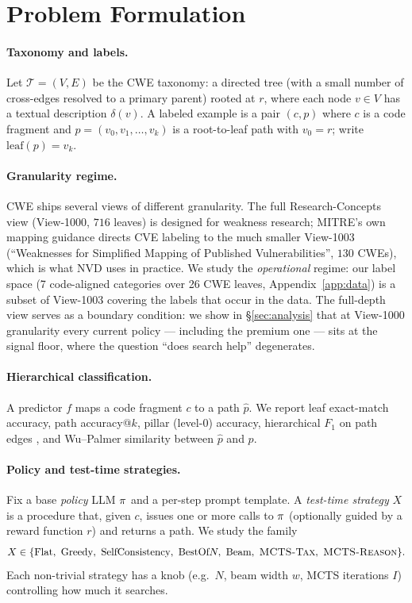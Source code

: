 \section{Problem Formulation}
\label{sec:problem}

\paragraph{Taxonomy and labels.}
Let $\mathcal{T}=(V, E)$ be the CWE taxonomy: a directed tree (with a small number
of cross-edges resolved to a primary parent) rooted at $r$, where each node
$v \in V$ has a textual description $\delta(v)$. A labeled example is a pair
$(c, p)$ where $c$ is a code fragment and $p = (v_0, v_1, \dots, v_k)$ is a
root-to-leaf path with $v_0=r$; write $\mathrm{leaf}(p) = v_k$.

\paragraph{Granularity regime.}
CWE ships several views of different granularity. The full Research-Concepts
view (View-1000, $716$ leaves) is designed for weakness research; MITRE's own
mapping guidance directs CVE labeling to the much smaller View-1003
(``Weaknesses for Simplified Mapping of Published Vulnerabilities'', $130$
CWEs), which is what NVD uses in practice. We study the \emph{operational}
regime: our label space (7 code-aligned categories over 26 CWE leaves,
Appendix~\ref{app:data}) is a subset of View-1003 covering the labels that
occur in the data. The full-depth view serves as a boundary condition: we show
in \S\ref{sec:analysis} that at View-1000 granularity every current policy ---
including the premium one --- sits at the signal floor, where the question
``does search help'' degenerates.

\paragraph{Hierarchical classification.}
A predictor $f$ maps a code fragment $c$ to a path $\hat p$. We report leaf
exact-match accuracy, path accuracy@$k$, pillar (level-0) accuracy, hierarchical
$F_1$ on path edges \citep{kosmopoulos2015evaluation}, and Wu--Palmer similarity
between $\hat p$ and $p$.

\paragraph{Policy and test-time strategies.}
Fix a base \emph{policy} LLM $\pi$ and a per-step prompt template. A
\emph{test-time strategy} $X$ is a procedure that, given $c$, issues one or more
calls to $\pi$ (optionally guided by a reward function $r$) and returns a
path. We study the family
\[
X \in \{\text{Flat},\ \text{Greedy},\ \text{SelfConsistency},\ \text{BestOf}N,\
\text{Beam},\ \mctstax,\ \mctsreas\}.
\]
Each non-trivial strategy has a knob (e.g.\ $N$, beam width $w$, MCTS iterations
$I$) controlling how much it searches.

